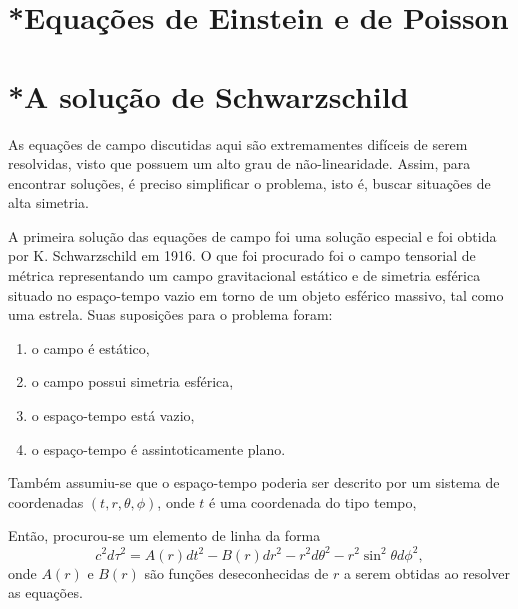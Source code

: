 \section{*Equações de Einstein e de Poisson}\label{sec:EinsteinPoisson}














\section{*A solução de Schwarzschild}\label{sec:Schwarzschild}

As equações de campo discutidas aqui são extremamentes difíceis de serem resolvidas, visto que possuem um alto grau de não-linearidade. Assim, para encontrar soluções, é preciso simplificar o problema, isto é, buscar situações de alta simetria.

A primeira solução das equações de campo foi uma solução especial e foi obtida por K. Schwarzschild em 1916. O que foi procurado foi o campo tensorial de métrica representando um campo gravitacional estático e de simetria esférica situado no espaço-tempo vazio em torno de um objeto esférico massivo, tal como uma estrela. Suas suposições para o problema foram:
\begin{enumerate}[label=(\alph*)]
	\item o campo é estático,\label{sup:estatico}
	\item o campo possui simetria esférica,\label{sup:esferico}
	\item o espaço-tempo está vazio, \label{sup:vazio}
	\item o espaço-tempo é assintoticamente plano.\label{sup:plano}
\end{enumerate}

Também assumiu-se que o espaço-tempo poderia ser descrito por um sistema de coordenadas $(t,r,\theta,\phi)$, onde $t$ é uma {\color{red} coordenada do tipo tempo}, %

Então, procurou-se um elemento de linha da forma
\begin{equation}\label{eq:ElementoLinhaSchwarzschildPostulado}
	c^2d\tau^2=A(r)dt^2-B(r)dr^2-r^2d\theta^2-r^2\sin^2\theta d\phi^2,
\end{equation}
onde $A(r)$ e $B(r)$ são funções deseconhecidas de $r$ a serem obtidas ao resolver as equações.

